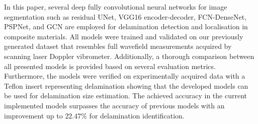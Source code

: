 In this paper, several deep fully convolutional neural networks for image segmentation such as residual UNet, VGG16 encoder-decoder, FCN-DenseNet, PSPNet, and GCN are employed for delamination detection and localisation in composite materials.
All models were trained and validated on our previously generated dataset that resembles full wavefield measurements acquired by scanning laser Doppler vibrometer.
Additionally, a thorough comparison between all presented models is provided based on several evaluation metrics.
Furthermore, the models were verified on experimentally acquired data with a Teflon insert representing delamination showing that the developed models can be used for delamination size estimation.
The achieved accuracy in the current implemented models surpasses the accuracy of previous models with an improvement up to $22.47\%$ for delamination identification.

